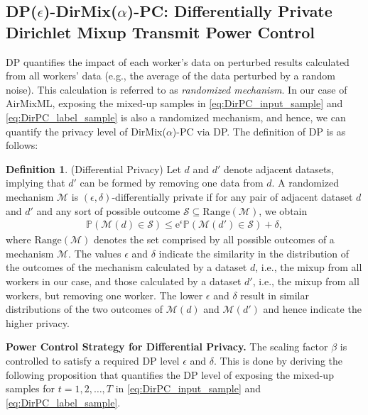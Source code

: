 \documentclass[conference,10pt]{IEEEtran}
\theoremstyle{definition}
\theoremstyle{definition}
\newtheorem{dfn}{Definition}
\begin{document}
\subsection{DP($\epsilon$)-DirMix($\alpha$)-PC: Differentially Private Dirichlet Mixup Transmit Power Control}
\label{subsec:DP_DirMix}
DP quantifies the impact of each worker's data on perturbed results calculated from all workers' data (e.g., the average of the data perturbed by a random noise).
This calculation is referred to as \textit{randomized mechanism}.
In our case of AirMixML, exposing the mixed-up samples in \eqref{eq:DirPC_input_sample} and \eqref{eq:DirPC_label_sample} is also a randomized mechanism, and hence, we can quantify the privacy level of \textsf{DirMix($\alpha$)-PC} via DP.
The definition of DP is as follows:
\begin{dfn}
	(Differential Privacy\cite{dwork2014algorithmic})
	Let $d$ and $d'$ denote adjacent datasets, implying that $d'$ can be formed by removing one data from $d$.
	A randomized mechanism $\mathcal{M}$ is $(\epsilon, \delta)$-differentially private if for any pair of adjacent dataset
	$d$ and $d'$ and any sort of possible outcome $\mathcal{S}\subseteq\mathrm{Range}(\mathcal{M})$, we obtain
	\begin{align}
		\label{eq:DP}
		\mathbb{P}(\mathcal{M}(d)\in \mathcal{S}) \leq \mathrm{e}^{\epsilon}\mathbb{P}(\mathcal{M}(d')\in \mathcal{S}) + \delta,
	\end{align}
	where $\mathrm{Range}(\mathcal{M})$ denotes the set comprised by all possible outcomes of a mechanism $\mathcal{M}$.
	The values $\epsilon$ and $\delta$ indicate the similarity in the distribution of the outcomes of the mechanism calculated by a dataset $d$, i.e., the mixup from all workers in our case, and those calculated by a dataset $d'$, i.e., the mixup from all workers, but removing one worker.
	The lower $\epsilon$ and $\delta$ result in similar distributions of the two outcomes of $\mathcal{M}(d)$ and $\mathcal{M}(d')$ and hence indicate the higher privacy.
\end{dfn}

\noindent \textbf{Power Control Strategy for Differential Privacy.}\quad
The scaling factor $\beta$ is controlled to satisfy a required DP level $\epsilon$ and $\delta$.
This is done by deriving the following proposition that quantifies the DP level of exposing the mixed-up samples for $t = 1, 2, \dots, T$ in \eqref{eq:DirPC_input_sample} and \eqref{eq:DirPC_label_sample}.
\end{document}
